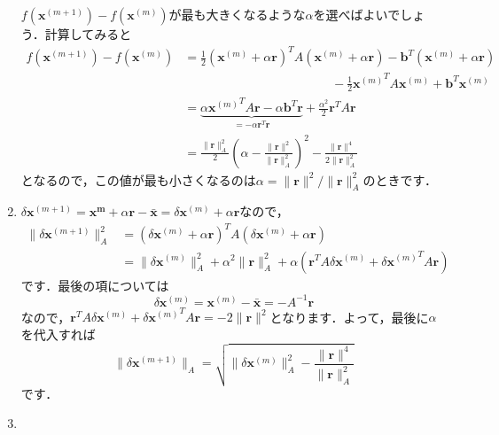 \documentclass[a4paper,pdflatex,ja=standard]{bxjsarticle}
\begin{document}
\begin{enumerate}
  $f(\bm{x}^{(m+1)})-f(\bm{x}^{(m)})$が最も大きくなるような$\alpha$を選べばよいでしょう．計算してみると
  \begin{align}
    f(\bm{x}^{(m+1)})-f(\bm{x}^{(m)})
    &=
    \frac{1}{2}
    (\bm{x}^{(m)}+\alpha\bm{r})^{T}A(\bm{x}^{(m)}+\alpha\bm{r})
    -
    \bm{b}^{T}(\bm{x}^{(m)}+\alpha\bm{r})
    \nonumber
    \\
    &\hspace{5cm}
    -
    \frac{1}{2}{\bm{x}^{(m)}}^{T}A\bm{x}^{(m)}
    +
    \bm{b}^{T}\bm{x}^{(m)}
    \nonumber
    \\
    &=
    \underbrace{
      \alpha{\bm{x}^{(m)}}^{T}A\bm{r}
      -
      \alpha\bm{b}^{T}\bm{r}
    }_{=-\alpha\bm{r}^{T}\bm{r}}
    +
    \frac{\alpha^2}{2}\bm{r}^{T}A\bm{r}
    \nonumber
    \\
    &=
    \frac{\|\bm{r}\|_{A}^2}{2}
    \left(  
      \alpha-\frac{\|\bm{r}\|^2}{\|\bm{r}\|_{A}^2}
    \right)^2
    -
    \frac{\|\bm{r}\|^4}{2\|\bm{r}\|_{A}^2}
  \end{align}
  となるので，この値が最も小さくなるのは$\alpha=\|\bm{r}\|^2/\|\bm{r}\|_{A}^2$のときです．


  \item 

  $\delta\bm{x}^{(m+1)}=\bm{x^{m}}+\alpha\bm{r}-\bar{\bm{x}}=\delta\bm{x}^{(m)}+\alpha\bm{r}$なので，
  \begin{align}
    \|\delta\bm{x}^{(m+1)}\|_A^2
    &=
    (\delta\bm{x}^{(m)}+\alpha\bm{r})^{T}A(\delta\bm{x}^{(m)}+\alpha\bm{r})
    \nonumber
    \\
    &=
    \|\delta\bm{x}^{(m)}\|_{A}^2
    +
    \alpha^2\|\bm{r}\|_{A}^2
    +
    \alpha(\bm{r}^TA\delta\bm{x}^{(m)}+{\delta\bm{x}^{(m)}}^{T}A\bm{r})
  \end{align}
  です．最後の項については
  \begin{equation}
    \delta\bm{x}^{(m)}
    =
    \bm{x}^{(m)}-\bar{\bm{x}}
    =
    -A^{-1}\bm{r}
  \end{equation}
  なので，$\bm{r}^TA\delta\bm{x}^{(m)}+{\delta\bm{x}^{(m)}}^{T}A\bm{r}=-2\|\bm{r}\|^2$となります．よって，最後に$\alpha$を代入すれば
  \begin{equation}    
    \|\delta\bm{x}^{(m+1)}\|_A
    =
    \sqrt{
      \|\delta\bm{x}^{(m)}\|_{A}^2
      -
      \frac{\|\bm{r}\|^4}{\|\bm{r}\|_A^2}
    }
  \end{equation}
  です．


  \item 


\end{enumerate}
\end{document}
